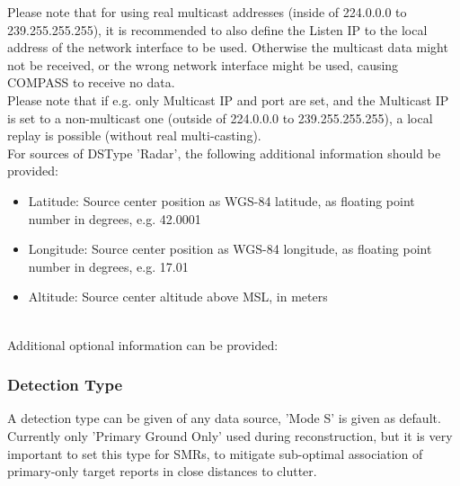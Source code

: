 Please note that for using real multicast addresses (inside of 224.0.0.0 to 239.255.255.255), it is recommended to also define the Listen IP to the local address of the network interface to be used. Otherwise the multicast data might not be received, or the wrong network interface might be used, causing COMPASS to receive no data. \\

Please note that if e.g. only Multicast IP and port are set, and the Multicast IP is set to a non-multicast one (outside of 224.0.0.0 to 239.255.255.255), a local replay is possible (without real multi-casting). \\

For sources of DSType 'Radar', the following additional information should be provided:

\begin{itemize}
\item Latitude: Source center position as WGS-84 latitude, as floating point number in degrees, e.g. 42.0001
\item Longitude: Source center position as WGS-84 longitude, as floating point number in degrees, e.g. 17.01
\item Altitude: Source center altitude above MSL, in meters
\end{itemize}
\ \\

Additional optional information can be provided:

\subsubsection{Detection Type}

A detection type can be given of any data source, 'Mode S' is given as default. Currently only 'Primary Ground Only' used during reconstruction, but it is very important to set this type for SMRs, to mitigate sub-optimal association of primary-only target reports in close distances to clutter. \\


